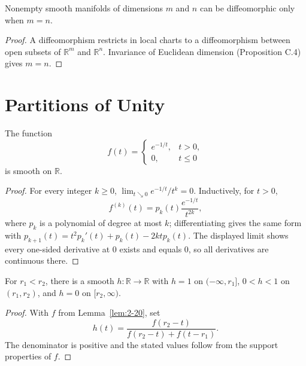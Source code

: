 \begin{theorem}
\label{thm:2-17}
\leanok
{}
Nonempty smooth manifolds of dimensions $m$ and $n$ can be diffeomorphic only when $m=n$.
\end{theorem}

\begin{proof}
\leanok
\sketch A diffeomorphism restricts in local charts to a diffeomorphism between open subsets of $\mathbb R^m$ and $\mathbb R^n$. Invariance of Euclidean dimension (Proposition C.4) gives $m=n$.
\end{proof}

\section{Partitions of Unity}

\begin{lemma}
\label{lem:2-20}
\mathlibok
{}
The function
\[
f(t)=\begin{cases}e^{-1/t},&t>0,\\0,&t\leq0\end{cases}
\]
is smooth on $\mathbb R$.
\end{lemma}

\begin{proof}
\sketch For every integer $k\geq0$, $\lim_{t\searrow0}e^{-1/t}/t^k=0$. Inductively, for $t>0$,
\[
f^{(k)}(t)=p_k(t)\frac{e^{-1/t}}{t^{2k}},
\]
where $p_k$ is a polynomial of degree at most $k$; differentiating gives the same form with $p_{k+1}(t)=t^2p_k'(t)+p_k(t)-2ktp_k(t)$. The displayed limit shows every one-sided derivative at $0$ exists and equals $0$, so all derivatives are continuous there.
\end{proof}

\begin{lemma}
\label{lem:2-21}
\leanok
{}
For $r_1<r_2$, there is a smooth $h:\mathbb R\to\mathbb R$ with $h=1$ on $(-\infty,r_1]$, $0<h<1$ on $(r_1,r_2)$, and $h=0$ on $[r_2,\infty)$.
\end{lemma}

\begin{proof}
\leanok
\sketch With $f$ from Lemma~\ref{lem:2-20}, set
\[
h(t)=\frac{f(r_2-t)}{f(r_2-t)+f(t-r_1)}.
\]
The denominator is positive and the stated values follow from the support properties of $f$.
\end{proof}

